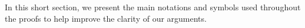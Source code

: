 \documentclass[11pt]{article}
\theoremstyle{definition}
\numberwithin{equation}{section}%
\begin{document}


In this short section, we present the main notations and symbols used throughout the proofs to help improve the clarity of our arguments.
\end{document}
